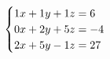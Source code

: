 \documentclass[preview]{standalone}
\begin{document}
\begin{align*}
\special{dvisvgm:raw <g id='unique000'>}\begin{cases} 1x + 1y + 1z = 6 \\ 0x + 2y + 5z = -4 \\ 2x + 5y - 1z = 27 \end{cases}\special{dvisvgm:raw </g>}
\end{align*}
\end{document}
